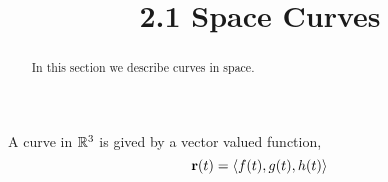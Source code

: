 \documentclass[handout]{ximera}
\title{2.1 Space Curves}
\begin{document}
\begin{abstract}
In this section we describe curves in space.
\end{abstract}
 
\maketitle





A curve in $\mathbb R^3$ is gived by a vector valued function,
\[
\mathbf r(t) = \left\langle f(t), g(t), h(t)\right\rangle
\]
\end{document}
